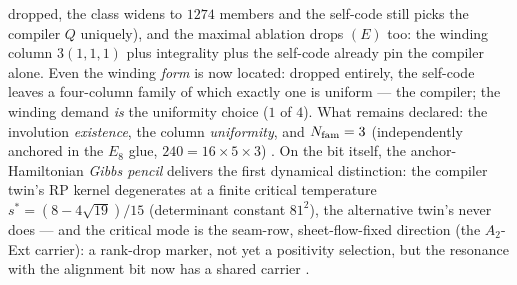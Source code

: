 \begin{keybox}
dropped, the class widens to $1274$ members and the self-code still
picks the compiler $Q$ uniquely), and the maximal ablation drops $(E)$
too: the winding column $3(1,1,1)$ plus integrality plus the self-code
already pin the compiler alone.  Even the winding \emph{form} is now
located: dropped entirely, the self-code leaves a four-column family of
which exactly one is uniform --- the compiler; the winding demand
\emph{is} the uniformity choice ($1$ of $4$).  What remains declared:
the involution \emph{existence}, the column \emph{uniformity}, and
$N_{\mathrm{fam}}=3$ (independently anchored in the $E_8$ glue,
$240=16\times5\times3$) \mE.  On the bit itself, the
anchor-Hamiltonian \emph{Gibbs pencil} delivers the first dynamical
distinction: the compiler twin's RP kernel degenerates at a finite
critical temperature $s^*=(8-4\sqrt{19})/15$ (determinant constant
$81^2$), the alternative twin's never does --- and the critical mode is
the seam-row, sheet-flow-fixed direction (the $A_2$-Ext carrier): a
rank-drop marker, not yet a positivity selection, but the resonance
with the alignment bit now has a shared carrier \mE.
\end{keybox}



